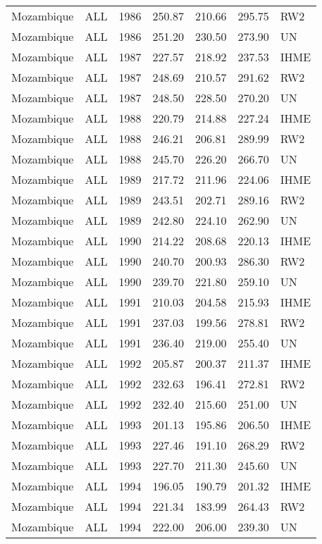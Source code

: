 \begin{longtable}{lllrrrl}
  Mozambique & ALL & 1986 & 250.87 & 210.66 & 295.75 & RW2 \\ 
  Mozambique & ALL & 1986 & 251.20 & 230.50 & 273.90 & UN \\ 
  Mozambique & ALL & 1987 & 227.57 & 218.92 & 237.53 & IHME \\ 
  Mozambique & ALL & 1987 & 248.69 & 210.57 & 291.62 & RW2 \\ 
  Mozambique & ALL & 1987 & 248.50 & 228.50 & 270.20 & UN \\ 
  Mozambique & ALL & 1988 & 220.79 & 214.88 & 227.24 & IHME \\ 
  Mozambique & ALL & 1988 & 246.21 & 206.81 & 289.99 & RW2 \\ 
  Mozambique & ALL & 1988 & 245.70 & 226.20 & 266.70 & UN \\ 
  Mozambique & ALL & 1989 & 217.72 & 211.96 & 224.06 & IHME \\ 
  Mozambique & ALL & 1989 & 243.51 & 202.71 & 289.16 & RW2 \\ 
  Mozambique & ALL & 1989 & 242.80 & 224.10 & 262.90 & UN \\ 
  Mozambique & ALL & 1990 & 214.22 & 208.68 & 220.13 & IHME \\ 
  Mozambique & ALL & 1990 & 240.70 & 200.93 & 286.30 & RW2 \\ 
  Mozambique & ALL & 1990 & 239.70 & 221.80 & 259.10 & UN \\ 
  Mozambique & ALL & 1991 & 210.03 & 204.58 & 215.93 & IHME \\ 
  Mozambique & ALL & 1991 & 237.03 & 199.56 & 278.81 & RW2 \\ 
  Mozambique & ALL & 1991 & 236.40 & 219.00 & 255.40 & UN \\ 
  Mozambique & ALL & 1992 & 205.87 & 200.37 & 211.37 & IHME \\ 
  Mozambique & ALL & 1992 & 232.63 & 196.41 & 272.81 & RW2 \\ 
  Mozambique & ALL & 1992 & 232.40 & 215.60 & 251.00 & UN \\ 
  Mozambique & ALL & 1993 & 201.13 & 195.86 & 206.50 & IHME \\ 
  Mozambique & ALL & 1993 & 227.46 & 191.10 & 268.29 & RW2 \\ 
  Mozambique & ALL & 1993 & 227.70 & 211.30 & 245.60 & UN \\ 
  Mozambique & ALL & 1994 & 196.05 & 190.79 & 201.32 & IHME \\ 
  Mozambique & ALL & 1994 & 221.34 & 183.99 & 264.43 & RW2 \\ 
  Mozambique & ALL & 1994 & 222.00 & 206.00 & 239.30 & UN \\ 

\end{longtable}
